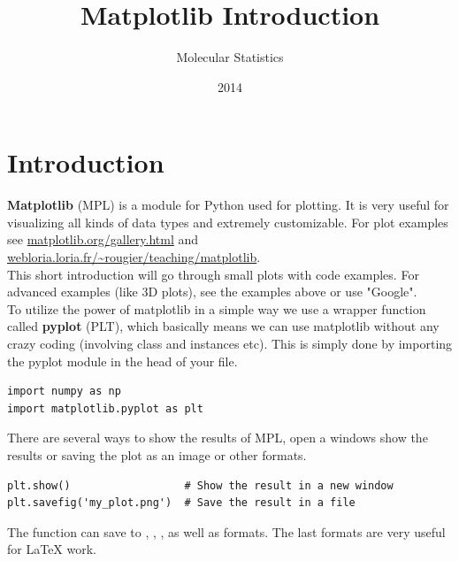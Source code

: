 \documentclass{article}
\title{Matplotlib Introduction}
\author{Molecular Statistics}
\date{2014}
\begin{document}

\maketitle

\section{Introduction}

{\bf Matplotlib} (MPL) is a module for Python used for plotting.
It is very useful for visualizing all kinds of data types and extremely customizable.
For plot examples see 
\href{http://matplotlib.org/gallery.html}{matplotlib.org/gallery.html} and
\href{http://webloria.loria.fr/~rougier/teaching/matplotlib/}{webloria.loria.fr/\~{}rougier/teaching/matplotlib}. \\

This short introduction will go through small plots with code examples. For advanced examples (like 3D plots), see the examples above or use "Google".\\

To utilize the power of matplotlib in a simple way we use a wrapper function called {\bf pyplot} (PLT), which basically means we can use matplotlib without any crazy coding (involving class and instances etc).
This is simply done by importing the pyplot module in the head of your  file.

\begin{lstlisting}
import numpy as np
import matplotlib.pyplot as plt
\end{lstlisting}

There are several ways to show the results of MPL, open a windows show the results or saving the plot as an image or other formats.

\begin{lstlisting}
plt.show()                  # Show the result in a new window
plt.savefig('my_plot.png')  # Save the result in a file
\end{lstlisting}


The  function can save to
,
,
,
as well as
 formats. The last formats are very useful for {\LaTeX} work.\\
\end{document}
